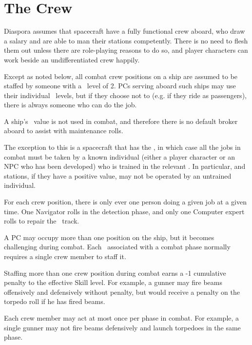 \section{The Crew}
\label{sec:the-crew}

Diaspora assumes that spacecraft have a fully functional crew aboard, who draw a salary and are able to man their stations competently.  There is no need to flesh them out unless there are role-playing reasons to do so, and player characters can work beside an undifferentiated crew happily.

Except as noted below, all combat crew positions on a ship are assumed to be staffed by someone with a \Skill\ level of 2.  PCs serving aboard such ships may use their individual \Skill\ levels, but if they choose not to (e.g. if they ride as passengers), there is always someone who can do the job.

A ship's \Trade\ value is not used in combat, and therefore there is no default broker aboard to assist with maintenance rolls.

The exception to this is a spacecraft that has the  \Stunt, in which case all the jobs in combat must be taken by a known individual (either a player character or an NPC who has been developed) who is trained in the relevant \Skill. In particular,  and  stations, if they have a positive value, may not be operated by an untrained individual.

For each crew position, there is only ever one person doing a given job at a given time. One Navigator rolls in the detection phase, and only one Computer expert rolls to repair the \Data\ track.

A PC may occupy more than one position on the ship, but it becomes challenging during combat. Each \Skill\ associated with a combat phase normally requires a single crew member to staff it.

Staffing more than one crew position during combat earns a -1
cumulative penalty to the effective Skill level.
For example, a gunner may fire beams offensively and defensively without penalty, but would receive a penalty on the torpedo roll if he has fired beams.

Each crew member may act at most once per phase in combat.
For example, a single gunner may not fire beams defensively and launch torpedoes in the same phase.

